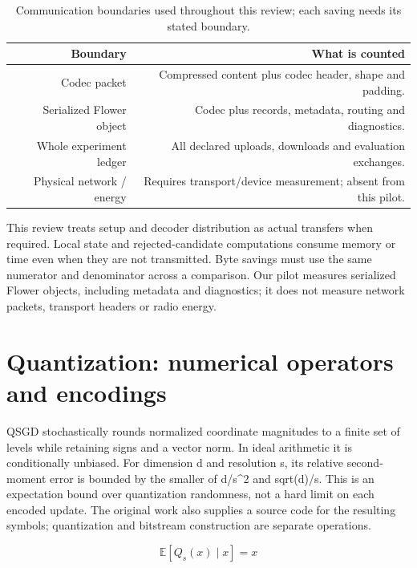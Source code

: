 \documentclass[11pt,a4paper]{article}
\begin{document}
\begin{table}[htbp]
\centering
\small
\begin{tabularx}{\textwidth}{R{0.60000}R{1.40000}}
\toprule
\textbf{Boundary} & \textbf{What is counted} \\\midrule
Codec packet & Compressed content plus codec header, shape and padding. \\
Serialized Flower object & Codec plus records, metadata, routing and diagnostics. \\
Whole experiment ledger & All declared uploads, downloads and evaluation exchanges. \\
Physical network / energy & Requires transport/device measurement; absent from this pilot. \\
\bottomrule
\end{tabularx}
\caption{Communication boundaries used throughout this review; each saving needs its stated boundary.}
\label{tab:accounting}
\end{table}

This review treats setup and decoder distribution as actual transfers when required. Local state and rejected-candidate computations consume memory or time even when they are not transmitted. Byte savings must use the same numerator and denominator across a comparison. Our pilot measures serialized Flower objects, including metadata and diagnostics; it does not measure network packets, transport headers or radio energy.

\section{Quantization: numerical operators and encodings}

QSGD stochastically rounds normalized coordinate magnitudes to a finite set of levels while retaining signs and a vector norm. In ideal arithmetic it is conditionally unbiased. For dimension d and resolution s, its relative second-moment error is bounded by the smaller of d/s\textasciicircum{}2 and sqrt(d)/s. This is an expectation bound over quantization randomness, not a hard limit on each encoded update. The original work also supplies a source code for the resulting symbols; quantization and bitstream construction are separate operations. \parencite{alistarh2017qsgd}

\begin{equation*}\mathbb{E}[Q_s(x)\mid x] = x\end{equation*}
\end{document}
